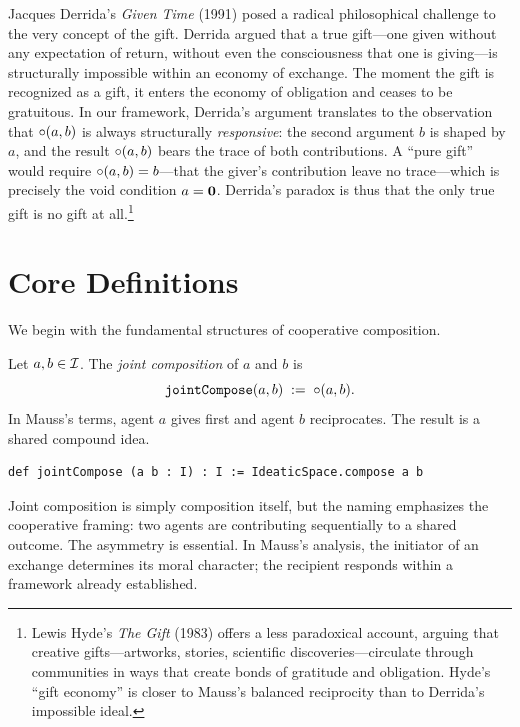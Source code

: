 Jacques Derrida's \textit{Given Time} (1991) posed a radical
philosophical challenge to the very concept of the gift.  Derrida
argued that a true gift---one given without any expectation of return,
without even the consciousness that one is giving---is structurally
impossible within an economy of exchange.  The moment the gift is
recognized as a gift, it enters the economy of obligation and ceases
to be gratuitous.  In our framework, Derrida's argument translates to
the observation that $\circ(a, b)$ is always structurally
\emph{responsive}: the second argument $b$ is shaped by $a$, and the
result $\circ(a, b)$ bears the trace of both contributions.  A
``pure gift'' would require $\circ(a, b) = b$---that the giver's
contribution leave no trace---which is precisely the void condition
$a = \mathbf{0}$.  Derrida's paradox is thus that the only true gift is
no gift at all.\footnote{Lewis Hyde's \textit{The Gift} (1983) offers
a less paradoxical account, arguing that creative gifts---artworks,
stories, scientific discoveries---circulate through communities in ways
that create bonds of gratitude and obligation.  Hyde's ``gift economy''
is closer to Mauss's balanced reciprocity than to Derrida's impossible
ideal.}

\section{Core Definitions}
\label{sec:ch16-defs}

We begin with the fundamental structures of cooperative composition.

\begin{definition}
\label{def:jointCompose}
Let $a, b \in \mathcal{I}$.  The \emph{joint composition} of $a$ and $b$ is
\[
  \texttt{jointCompose}(a, b) \;:=\; \circ(a, b).
\]
In Mauss's terms, agent $a$ gives first and agent $b$ reciprocates.
The result is a shared compound idea.
\end{definition}

\begin{lstlisting}[caption={Joint composition in Lean}]
def jointCompose (a b : I) : I := IdeaticSpace.compose a b
\end{lstlisting}

Joint composition is simply composition itself, but the naming emphasizes the
cooperative framing: two agents are contributing sequentially to a shared
outcome.  The asymmetry is essential.  In Mauss's analysis, the initiator of
an exchange determines its moral character; the recipient responds within a
framework already established.

